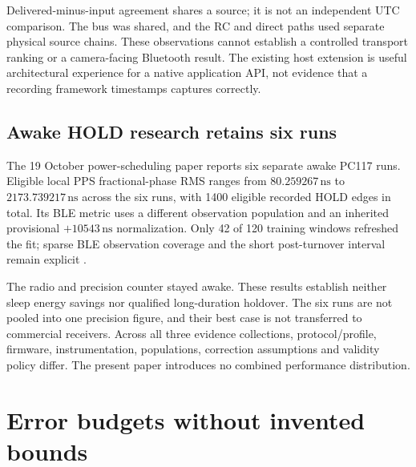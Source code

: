 \documentclass[11pt,letterpaper]{article}
\newcommand{\ns}{\,\mathrm{ns}}\newcommand{\ms}{\,\mathrm{ms}}\newcommand{\ppm}{\,\mathrm{ppm}}
\begin{document}
Delivered-minus-input agreement shares a source; it is not an independent UTC comparison. The bus was shared, and the RC and direct paths used separate physical source chains. These observations cannot establish a controlled transport ranking or a camera-facing Bluetooth result. The existing host extension is useful architectural experience for a native application API, not evidence that a recording framework timestamps captures correctly.

\subsection{Awake HOLD research retains six runs}
The 19 October power-scheduling paper reports six separate awake PC117 runs. Eligible local PPS fractional-phase RMS ranges from $80.259267\ns$ to $2173.739217\ns$ across the six runs, with 1400 eligible recorded HOLD edges in total. Its BLE metric uses a different observation population and an inherited provisional $+10543\ns$ normalization. Only 42 of 120 training windows refreshed the fit; sparse BLE observation coverage and the short post-turnover interval remain explicit \cite{power}.

The radio and precision counter stayed awake. These results establish neither sleep energy savings nor qualified long-duration holdover. The six runs are not pooled into one precision figure, and their best case is not transferred to commercial receivers. Across all three evidence collections, protocol/profile, firmware, instrumentation, populations, correction assumptions and validity policy differ. The present paper introduces no combined performance distribution.

\section{Error budgets without invented bounds}\label{sec:error}
\end{document}
